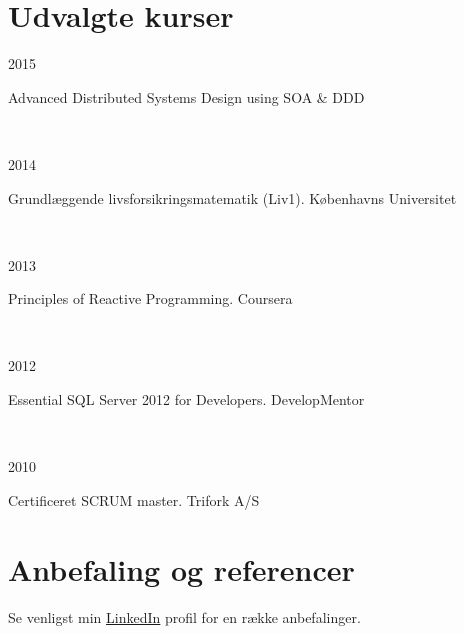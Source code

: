 \documentclass[10pt, a4paper]{article}
\begin{document}
\section{Udvalgte kurser}
\begin{Row}%
  \begin{Cell}{1}
    2015
  \end{Cell}
  \begin{Cell}{3}
    Advanced Distributed Systems Design using SOA \& DDD
  \end{Cell}
\end{Row}
\\[0.5cm]
\begin{Row}%
  \begin{Cell}{1}
    2014
  \end{Cell}
  \begin{Cell}{3}
    Grundlæggende livsforsikringsmatematik (Liv1). Københavns Universitet
  \end{Cell}
\end{Row}
\\[0.5cm]
\begin{Row}%
  \begin{Cell}{1}
    2013
  \end{Cell}
  \begin{Cell}{3}
    Principles of Reactive Programming. Coursera
  \end{Cell}
\end{Row}
\\[0.5cm]
\begin{Row}%
  \begin{Cell}{1}
    2012
  \end{Cell}
  \begin{Cell}{3}
    Essential SQL Server 2012 for Developers. DevelopMentor
  \end{Cell}
\end{Row}
\\[0.5cm]
\begin{Row}%
  \begin{Cell}{1}
    2010
  \end{Cell}
  \begin{Cell}{3}
    Certificeret SCRUM master. Trifork A/S
  \end{Cell}
\end{Row}

\section{Anbefaling og referencer}
Se venligst min \href{https://dk.linkedin.com/in/carstenjoergensen}{LinkedIn} profil for en række anbefalinger. 
\end{document}
